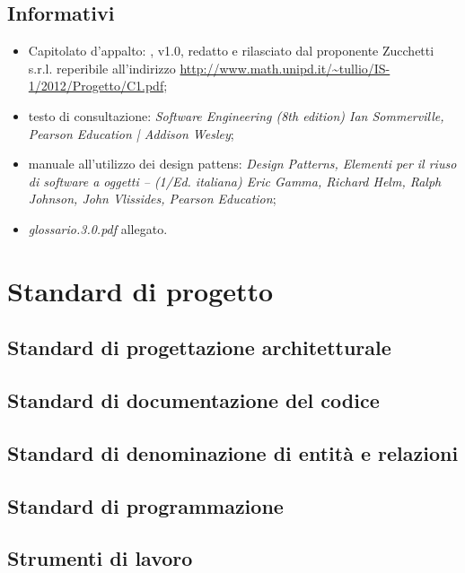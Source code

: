 \subsection{Informativi}
\begin{itemize}
\item[] Capitolato d'appalto: \caName{}, v1.0, redatto e rilasciato dal proponente Zucchetti s.r.l. reperibile all'indirizzo \url{http://www.math.unipd.it/~tullio/IS-1/2012/Progetto/C1.pdf};
\item[] testo di consultazione: \textit{Software Engineering (8th edition) Ian Sommerville, Pearson Education | Addison Wesley};
\item[] manuale all'utilizzo dei design pattens: \textit{Design Patterns, Elementi per il riuso di software a oggetti -- (1/Ed. italiana) Eric Gamma, Richard Helm, Ralph Johnson, John Vlissides, Pearson Education};
\item[] \textit{glossario.3.0.pdf} allegato.
\end{itemize}
\clearpage

\section{Standard di progetto}

\subsection{Standard di progettazione architetturale}

\subsection{Standard di documentazione del codice}

\subsection{Standard di denominazione di entità e relazioni}

\subsection{Standard di programmazione}

\subsection{Strumenti di lavoro}

\clearpage

